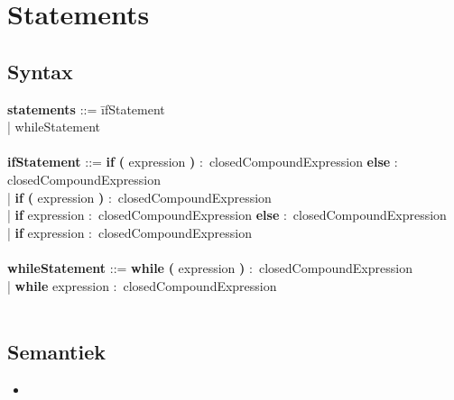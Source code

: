 \section{Statements}
    \subsection{Syntax}
        \begin{tabbing}
        {\bf statements}                  ::= \=ifStatement\\
                                          \>| whileStatement\\
        \\
        {\bf ifStatement}                 ::= \=\textbf{if} \=\textbf{(} expression \textbf{)} $\colon$ closedCompoundExpression \textbf    {else} $\colon$ closedCompoundExpression\\
                                      \>| \textbf{if} \textbf{(} expression \textbf{)} $\colon$ closedCompoundExpression\\
                                      \>| \textbf{if} expression $\colon$ closedCompoundExpression \textbf{else} $\colon$ closedCompoundExpression\\
                                      \>| \textbf{if} expression $\colon$ closedCompoundExpression\\
        \\
        {\bf whileStatement}              ::= \=\textbf{while} \textbf{(} expression \textbf{)} $\colon$ closedCompoundExpression\\
                                      \>| \textbf{while} expression $\colon$ closedCompoundExpression\\
        \\ 
        \end{tabbing}
    \subsection{Semantiek}
                \begin{itemize}
        \item 
        \end{itemize}

